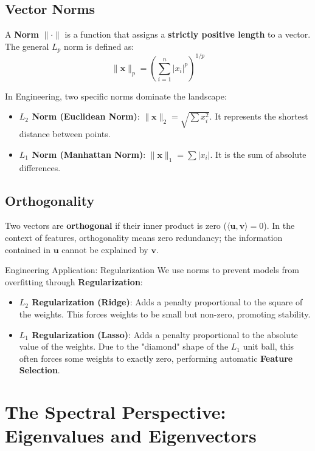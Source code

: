 \subsection{Vector Norms}
A \textbf{Norm} $\|\cdot\|$ is a function that assigns a \textbf{strictly positive length} to a vector. The general $L_p$ norm is defined as:
\begin{equation}
    \|\mathbf{x}\|_p = \left( \sum_{i=1}^n |x_i|^p \right)^{1/p}
\end{equation}

In Engineering, two specific norms dominate the landscape:
\begin{itemize}
    \item \textbf{$L_2$ Norm (Euclidean Norm)}: $\|\mathbf{x}\|_2 = \sqrt{\sum x_i^2}$. It represents the shortest distance between points.
    \item \textbf{$L_1$ Norm (Manhattan Norm)}: $\|\mathbf{x}\|_1 = \sum |x_i|$. It is the sum of absolute differences.
\end{itemize}



\subsection{Orthogonality}
Two vectors are \textbf{orthogonal} if their inner product is zero ($\langle \mathbf{u}, \mathbf{v} \rangle = 0$). In the context of features, orthogonality means zero redundancy; the information contained in $\mathbf{u}$ cannot be explained by $\mathbf{v}$.

\begin{unibobox}{Engineering Application: Regularization}
    We use norms to prevent models from overfitting through \textbf{Regularization}:
    \begin{itemize}
        \item \textbf{$L_2$ Regularization (Ridge)}: Adds a penalty proportional to the square of the weights. This forces weights to be small but non-zero, promoting stability.
        \item \textbf{$L_1$ Regularization (Lasso)}: Adds a penalty proportional to the absolute value of the weights. Due to the "diamond" shape of the $L_1$ unit ball, this often forces some weights to exactly zero, performing automatic \textbf{Feature Selection}.
    \end{itemize}
\end{unibobox}

\section{The Spectral Perspective: Eigenvalues and Eigenvectors}

